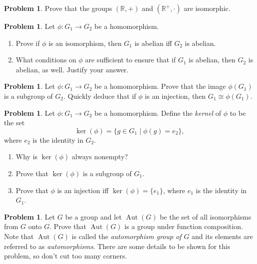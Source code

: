 \documentclass[11pt]{scrartcl}
\theoremstyle{definition}
\newtheorem{problem}[theorem]{Problem}
\DeclareMathOperator{\Aut}{Aut}
\begin{document}
\begin{problem}
Prove that the groups $(\mathbb{R},+)$ and $(\mathbb{R}^+,\cdot)$ are isomorphic.
\end{problem}


\begin{problem}
Let $\phi:G_1\to G_2$ be a homomorphism.
\begin{enumerate}[label=\rm{(\alph*)}]
\item Prove if $\phi$ is an isomorphism, then $G_1$ is abelian iff $G_2$ is abelian.
\item What conditions on $\phi$ are sufficient to ensure that if $G_1$ is abelian, then $G_2$ is abelian, as well.  Justify your answer.
\end{enumerate}
\end{problem}


\begin{problem}
Let $\phi:G_1\to G_2$ be a homomorphism.  Prove that the image $\phi(G_1)$ is a subgroup of $G_2$. Quickly deduce that if $\phi$ is an injection, then $G_1\cong \phi(G_1)$. 
\end{problem}

\begin{problem}
Let $\phi:G_1\to G_2$ be a homomorphism. Define the \emph{kernel} of $\phi$ to be the set
\[
\ker(\phi)=\{g\in G_1\mid \phi(g)=e_2\},
\]
where $e_2$ is the identity in $G_2$.
\begin{enumerate}[label=\rm{(\alph*)}]
\item Why is $\ker(\phi)$ always nonempty?
\item Prove that $\ker(\phi)$ is a subgroup of $G_1$.
\item Prove that $\phi$ is an injection iff $\ker(\phi)=\{e_1\}$, where $e_1$ is the identity in $G_1$.
\end{enumerate}
\end{problem}

\begin{problem}
Let $G$ be a group and let $\Aut(G)$  be the set of all isomorphisms from $G$ onto $G$.  Prove that $\Aut(G)$ is a group under function composition.  Note that $\Aut(G)$ is called the \emph{automorphism group of $G$} and its elements are referred to as \emph{automorphisms}.  There are some details to be shown for this problem, so don't cut too many corners.
\end{problem}
\end{document}
